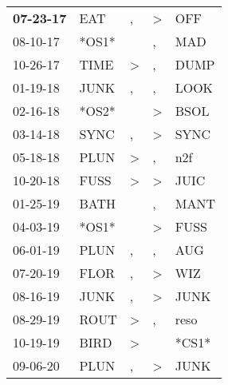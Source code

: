 \begin{supertabular}{p{0.07\textwidth}p{0.06\textwidth}p{0.02\textwidth}p{0.02\textwidth}p{0.06\textwidth}}
 \textbf{07-23-17\textsuperscript{}} &            EAT\textsuperscript{} &                , &     \textgreater &            OFF\textsuperscript{} \\
          08-10-17\textsuperscript{} &                            *OS1* &                  &                , &            MAD\textsuperscript{} \\
          10-26-17\textsuperscript{} &           TIME\textsuperscript{} &     \textgreater &                , &           DUMP\textsuperscript{} \\
          01-19-18\textsuperscript{} &           JUNK\textsuperscript{} &                , &                , &           LOOK\textsuperscript{} \\
          02-16-18\textsuperscript{} &                            *OS2* &                  &     \textgreater &           BSOL\textsuperscript{} \\
          03-14-18\textsuperscript{} &           SYNC\textsuperscript{} &                , &     \textgreater &           SYNC\textsuperscript{} \\
          05-18-18\textsuperscript{} &           PLUN\textsuperscript{} &     \textgreater &                , &            n2f\textsuperscript{} \\
          10-20-18\textsuperscript{} &           FUSS\textsuperscript{} &     \textgreater &     \textgreater &           JUIC\textsuperscript{} \\
          01-25-19\textsuperscript{} &           BATH\textsuperscript{} &                  &                , &           MANT\textsuperscript{} \\
          04-03-19\textsuperscript{} &                            *OS1* &                  &     \textgreater &           FUSS\textsuperscript{} \\
          06-01-19\textsuperscript{} &           PLUN\textsuperscript{} &                , &                , &            AUG\textsuperscript{} \\
          07-20-19\textsuperscript{} &           FLOR\textsuperscript{} &                , &     \textgreater &            WIZ\textsuperscript{} \\
          08-16-19\textsuperscript{} &           JUNK\textsuperscript{} &                , &     \textgreater &           JUNK\textsuperscript{} \\
          08-29-19\textsuperscript{} &           ROUT\textsuperscript{} &     \textgreater &                , &           reso\textsuperscript{} \\
          10-19-19\textsuperscript{} &           BIRD\textsuperscript{} &     \textgreater &                  &                            *CS1* \\
          09-06-20\textsuperscript{} &           PLUN\textsuperscript{} &                , &     \textgreater &           JUNK\textsuperscript{} \\
\end{supertabular}
